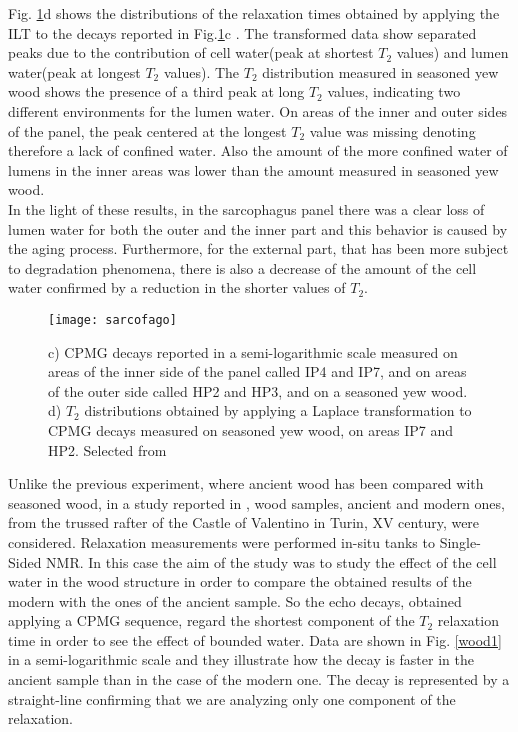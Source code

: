 \documentclass[a4paper,11pt]{report}
\begin{document}
Fig. \ref{sarcofago}d shows the distributions of the relaxation times obtained by applying the ILT to the decays reported in Fig.\ref{sarcofago}c .
The transformed data show separated peaks due to the contribution of cell water(peak at shortest $T_2$ values) and lumen water(peak at longest $T_2$ values). The $T_2$ distribution measured in seasoned yew wood shows the presence of a third peak at long $T_2$ values, indicating two different environments for the lumen water. On areas of the inner and outer sides of the panel, the peak centered at the longest $T_2$ value was missing denoting therefore a lack of confined water. Also the amount of the more confined water of lumens in the inner areas was lower than the amount measured in seasoned yew wood.\\
In the light of these results, in the sarcophagus panel there was a clear loss of lumen water for both the outer and the inner part and this behavior is caused by the aging process. Furthermore, for the external part, that has been more subject to degradation phenomena, there is also a decrease of the amount of the cell water confirmed by a reduction in the shorter values of $T_2$.\\
\begin{figure}[h]
	\centering
	\texttt{[image: sarcofago]}
	\caption{c) CPMG decays reported in a semi-logarithmic scale measured on areas of the inner side of the panel called IP4 and IP7, and on areas of the outer side called HP2 and HP3, and on a seasoned yew wood. d) $T_2$ distributions obtained by applying a Laplace transformation to CPMG decays measured on seasoned yew wood, on areas IP7 and HP2. Selected from \cite{trewood} }\label{sarcofago}
\end{figure}
Unlike the previous experiment, where ancient wood has been compared with seasoned wood, in a study reported in \cite{quattrowood} ,  wood samples, ancient and modern ones, from the trussed rafter of the Castle of Valentino in Turin, XV century, were considered. Relaxation measurements were performed in-situ tanks to Single-Sided NMR.
In this case the aim of the study was to study the effect of the cell water in the wood structure in order to compare the obtained results of the modern with the ones of the ancient sample.
So the echo decays, obtained applying a CPMG sequence, regard the shortest component of the $T_2$ relaxation time in order to see the effect of bounded water. Data are shown in Fig. \ref{wood1} in a semi-logarithmic scale and they illustrate how the decay is faster in the ancient sample than in the case of the modern one. The decay is represented by a straight-line confirming that we are analyzing only one component of the relaxation.
\end{document}
